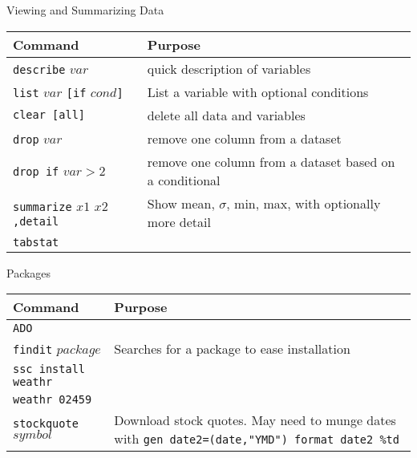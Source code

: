 \documentclass[11pt, oneside]{article}   	%
\begin{document}
\begin{center}
\large{Viewing and Summarizing Data}
\end{center}

\begin{tabular}{l p{} }
Command & Purpose \\
\hline
\texttt{describe} $var$  & quick description of variables \\

\texttt{list} $var$ \texttt{[if} $cond$\texttt{]} & List a variable with optional conditions\\

\texttt{clear [all]} & delete all data and variables \\

\texttt{drop} $var$ & remove one column from a dataset \\

\texttt{drop if} $var > 2$ & remove one column from a dataset based on a conditional\\

\texttt{summarize} $x1$ $x2$\texttt{,detail} & Show mean, $\sigma$, min, max, with optionally more detail\\

\texttt{tabstat} &  \\

\end{tabular}


\begin{center}
\large{Packages}
\end{center}

\begin{tabular}{l p{ } }
Command & Purpose \\
\hline
\texttt{ADO}& \\ 

\texttt{findit} $package$ & Searches for a package to ease installation\\ 

\texttt{ssc install weathr} &  \\


\texttt{weathr 02459} &  \\

\texttt{stockquote} $symbol$ & Download stock quotes. May need to munge dates with \texttt{gen date2=(date,"YMD")  format date2 \%td} \\



\end{tabular}
\end{document}
